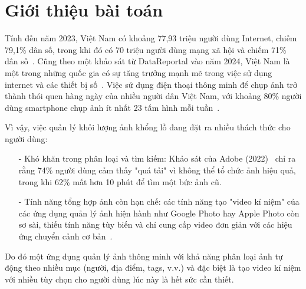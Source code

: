 \section{Giới thiệu bài toán}

Tính đến năm 2023, Việt Nam có khoảng 77,93 triệu người dùng Internet, chiếm 79,1\% dân số, trong khi đó có 70 triệu người dùng mạng xã hội và chiếm 71\% dân số~\cite{vnetwork2023}. Cũng theo một khảo sát từ DataReportal vào năm 2024, Việt Nam là một trong những quốc gia có sự tăng trưởng mạnh mẽ trong việc sử dụng internet và các thiết bị số~\cite{datareportal}. Việc sử dụng điện thoại thông minh để chụp ảnh trở thành thói quen hàng ngày của nhiều người dân Việt Nam, với khoảng 80\% người dùng smartphone chụp ảnh ít nhất 23 tấm hình mỗi tuần~\cite{qandme}.

Vì vậy, việc quản lý khối lượng ảnh khổng lồ đang đặt ra nhiều thách thức cho người dùng:
\begin{itemize}
	\item[-] Khó khăn trong phân loại và tìm kiếm: Khảo sát của Adobe (2022)~\cite{catchlight} chỉ ra rằng 74\% người dùng cảm thấy "quá tải" vì không thể tổ chức ảnh hiệu quả, trong khi 62\% mất hơn 10 phút để tìm một bức ảnh cũ.
	\item[-] Tính năng tổng hợp ảnh còn hạn chế: các tính năng tạo "video kỉ niệm" của các ứng dụng quản lý ảnh hiện hành như Google Photo hay Apple Photo còn sơ sài, thiếu tính năng tùy biến và chỉ cung cấp video đơn giản với các hiệu ứng chuyển cảnh cơ bản~\cite{usmobile}.
\end{itemize}

Do đó một ứng dụng quản lý ảnh thông minh với khả năng phân loại ảnh tự động theo nhiều mục (người, địa điểm, tags, v.v.) và đặc biệt là tạo video kỉ niệm với nhiều tùy chọn cho người dùng lúc này là hết sức cần thiết.


